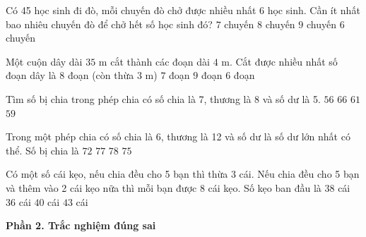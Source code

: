 \begin{ex} %
Có 45 học sinh đi đò, mỗi chuyến đò chở được nhiều nhất 6 học sinh. Cần ít nhất bao nhiêu chuyến đò để chở hết số học sinh đó?
\choice
{$7$ chuyến}
{\True $8$ chuyến}
{$9$ chuyến}
{$6$ chuyến}
\end{ex}

\begin{ex} %
Một cuộn dây dài $35\text{ m}$ cắt thành các đoạn dài $4\text{ m}$. Cắt được nhiều nhất số đoạn dây là
\choice
{\True $8$ đoạn (còn thừa $3\text{ m}$)}
{$7$ đoạn}
{$9$ đoạn}
{$6$ đoạn}
\end{ex}

\begin{ex} %
Tìm số bị chia trong phép chia có số chia là 7, thương là 8 và số dư là 5.
\choice
{$56$}
{$66$}
{\True $61$}
{$59$}
\end{ex}

\begin{ex} %
Trong một phép chia có số chia là 6, thương là 12 và số dư là số dư lớn nhất có thể. Số bị chia là
\choice
{$72$}
{\True $77$}
{$78$}
{$75$}
\end{ex}

\begin{ex} %
Có một số cái kẹo, nếu chia đều cho 5 bạn thì thừa 3 cái. Nếu chia đều cho 5 bạn và thêm vào 2 cái kẹo nữa thì mỗi bạn được 8 cái kẹo. Số kẹo ban đầu là
\choice
{\True $38$ cái}
{$36$ cái}
{$40$ cái}
{$43$ cái}
\end{ex}

\textbf{Phần 2. Trắc nghiệm đúng sai}

